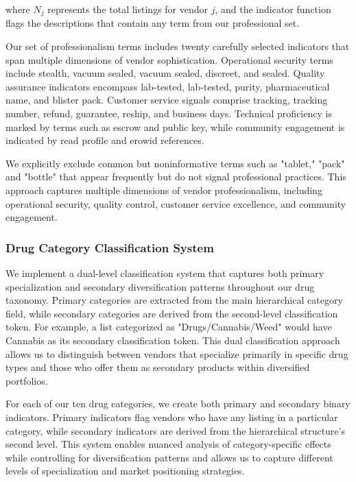 \documentclass{article}
\begin{document}
where $N_j$ represents the total listings for vendor $j$, and the indicator function flags the descriptions that contain any term from our professional set.

Our set of professionalism terms includes twenty carefully selected indicators that span multiple dimensions of vendor sophistication. Operational security terms include stealth, vacuum sealed, vacuum sealed, discreet, and sealed. Quality assurance indicators encompass lab-tested, lab-tested, purity, pharmaceutical name, and blister pack. Customer service signals comprise tracking, tracking number, refund, guarantee, reship, and business days. Technical proficiency is marked by terms such as escrow and public key, while community engagement is indicated by read profile and erowid references.

We explicitly exclude common but noninformative terms such as "tablet," "pack" and "bottle" that appear frequently but do not signal professional practices. This approach captures multiple dimensions of vendor professionalism, including operational security, quality control, customer service excellence, and community engagement.

\subsubsection{Drug Category Classification System}

We implement a dual-level classification system that captures both primary specialization and secondary diversification patterns throughout our drug taxonomy. Primary categories are extracted from the main hierarchical category field, while secondary categories are derived from the second-level classification token. For example, a list categorized as "Drugs/Cannabis/Weed" would have Cannabis as its secondary classification token. This dual classification approach allows us to distinguish between vendors that specialize primarily in specific drug types and those who offer them as secondary products within diversified portfolios.

For each of our ten drug categories, we create both primary and secondary binary indicators. Primary indicators flag vendors who have any listing in a particular category, while secondary indicators are derived from the hierarchical structure's second level. This system enables nuanced analysis of category-specific effects while controlling for diversification patterns and allows us to capture different levels of specialization and market positioning strategies.
\end{document}
